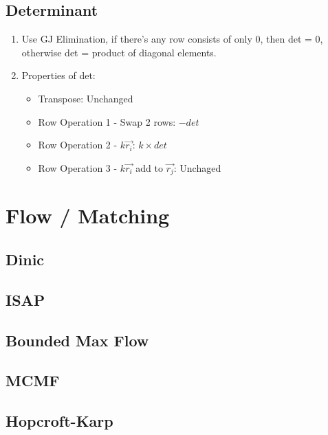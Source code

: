 \documentclass[a4paper,10pt,twocolumn,oneside]{article}
\begin{document}
\subsection{Determinant}
{\normalsize
\noindent
\begin{enumerate}
\item Use GJ Elimination, if there's any row consists of only 0, then det = 0, otherwise det = product of diagonal elements.
\item Properties of det:
\begin{itemize}
    \item Transpose: Unchanged
    \item Row Operation 1 - Swap 2 rows: $-det$
    \item Row Operation 2 - $k \overrightarrow{r_i}$: $k \times det$
    \item Row Operation 3 - $k \overrightarrow{r_i}$ add to  $\overrightarrow{r_j}$: Unchaged
\end{itemize}
\end{enumerate}
}

\section{Flow / Matching}

\subsection{Dinic}


\subsection{ISAP}


\subsection{Bounded Max Flow}


\subsection{MCMF}


\subsection{Hopcroft-Karp}

\end{document}
